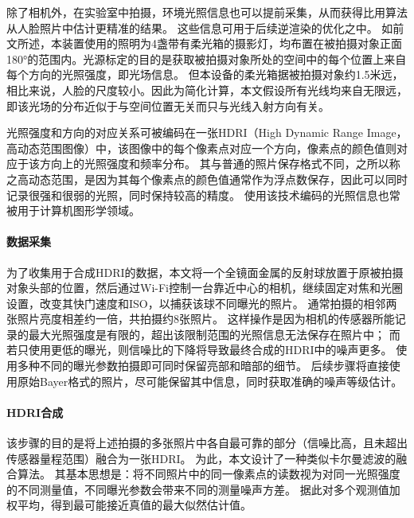 除了相机外，在实验室中拍摄，环境光照信息也可以提前采集，从而获得比用算法从人脸照片中估计更精准的结果。
这些信息可用于后续逆渲染的优化之中。
如前文所述，本装置使用的照明为4盏带有柔光箱的摄影灯，均布置在被拍摄对象正面180°的范围内。光源标定的目的是获取被拍摄对象所处的空间中的每个位置上来自每个方向的光照强度，即光场信息。
但本设备的柔光箱据被拍摄对象约1.5米远，相比来说，人脸的尺度较小。因此为简化计算，本文假设所有光线均来自无限远，即该光场的分布近似于与空间位置无关而只与光线入射方向有关。

光照强度和方向的对应关系可被编码在一张HDRI（High Dynamic Range Image，高动态范围图像）中，该图像中的每个像素点对应一个方向，像素点的颜色值则对应于该方向上的光照强度和频率分布。
其与普通的照片保存格式不同，之所以称之高动态范围，是因为其每个像素点的颜色值通常作为浮点数保存，因此可以同时记录很强和很弱的光照，同时保持较高的精度。
使用该技术编码的光照信息也常被用于计算机图形学领域。

\paragraph{数据采集}
为了收集用于合成HDRI的数据，本文将一个全镜面金属的反射球放置于原被拍摄对象头部的位置，然后通过Wi-Fi控制一台靠近中心的相机，继续固定对焦和光圈设置，改变其快门速度和ISO，以捕获该球不同曝光的照片。
通常拍摄的相邻两张照片亮度相差约一倍，共拍摄约8张照片。
这样操作是因为相机的传感器所能记录的最大光照强度是有限的，超出该限制范围的光照信息无法保存在照片中；
而若只使用更低的曝光，则信噪比的下降将导致最终合成的HDRI中的噪声更多。
使用多种不同的曝光参数拍摄即可同时保留亮部和暗部的细节。
后续步骤将直接使用原始Bayer格式的照片，尽可能保留其中信息，同时获取准确的噪声等级估计。

\paragraph{HDRI合成}
该步骤的目的是将上述拍摄的多张照片中各自最可靠的部分（信噪比高，且未超出传感器量程范围）融合为一张HDRI。
为此，本文设计了一种类似卡尔曼滤波的融合算法。
其基本思想是：将不同照片中的同一像素点的读数视为对同一光照强度的不同测量值，不同曝光参数会带来不同的测量噪声方差。
据此对多个观测值加权平均，得到最可能接近真值的最大似然估计值。

